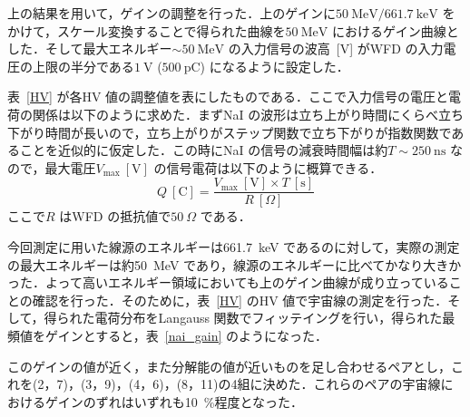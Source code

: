 上の結果を用いて，ゲインの調整を行った．上のゲインに$50~\mathrm{MeV} /661.7~\mathrm{keV}$ をかけて，スケール変換することで得られた曲線を$50~\mathrm{MeV}$ におけるゲイン曲線とした．そして最大エネルギー$\sim 50~\mathrm{MeV}$ の入力信号の波高~[V] がWFD の入力電圧の上限の半分である$1~\mathrm{V}$ ($500~\mathrm{pC}$) になるように設定した．

表~\ref{HV} が各HV 値の調整値を表にしたものである．ここで入力信号の電圧と電荷の関係は以下のように求めた．まずNaI の波形は立ち上がり時間にくらべ立ち下がり時間が長いので，立ち上がりがステップ関数で立ち下がりが指数関数であることを近似的に仮定した．この時にNaI の信号の減衰時間幅は約$T \sim 250~\mathrm{ns}$ なので，最大電圧$V_\mathrm{max}~[\mathrm{V}]$ の信号電荷は以下のように概算できる．
\begin{equation}
Q~[\mathrm{C}] = \frac{V_\mathrm{max}~[\mathrm{V}] \times T~[\mathrm{s}]}{R~[\Omega]}
\end{equation}
ここで$R$ はWFD の抵抗値で$50~\Omega$ である．

今回測定に用いた線源のエネルギーは661.7~keV であるのに対して，実際の測定の最大エネルギーは約50~MeV であり，線源のエネルギーに比べてかなり大きかった．よって高いエネルギー領域においても上のゲイン曲線が成り立っていることの確認を行った．そのために，表~\ref{HV} のHV 値で宇宙線の測定を行った．そして，得られた電荷分布をLangauss 関数でフィッテイングを行い，得られた最頻値をゲインとすると，表~\ref{nai_gain} のようになった．

このゲインの値が近く，また分解能の値が近いものを足し合わせるペアとし，これを(2，7)，(3，9)，(4，6)，(8，11)の4組に決めた．これらのペアの宇宙線におけるゲインのずれはいずれも10~\%程度となった．

